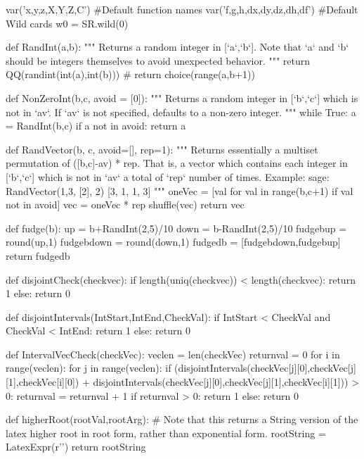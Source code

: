 \documentclass{ximera}
\begin{document}
\begin{sagesilent}
var('x,y,z,X,Y,Z,C')
#Default function names
var('f,g,h,dx,dy,dz,dh,df')
#Default Wild cards
w0 = SR.wild(0)


def RandInt(a,b):
    """ Returns a random integer in [`a`,`b`]. Note that `a` and `b` should be integers themselves to avoid unexpected behavior.
    """
    return QQ(randint(int(a),int(b)))
    # return choice(range(a,b+1))

def NonZeroInt(b,c, avoid = [0]):
    """ Returns a random integer in [`b`,`c`] which is not in `av`. 
        If `av` is not specified, defaults to a non-zero integer.
    """
    while True:
        a = RandInt(b,c)
        if a not in avoid:
            return a

def RandVector(b, c, avoid=[], rep=1):
    """ Returns essentially a multiset permutation of ([b,c]-av) * rep.
        That is, a vector which contains each integer in [`b`,`c`] which is not in `av` a total of `rep` number of times.
        Example:
        sage: RandVector(1,3, [2], 2)
        [3, 1, 1, 3]
    """
    oneVec = [val for val in range(b,c+1) if val not in avoid]
    vec = oneVec * rep
    shuffle(vec)
    return vec


def fudge(b):
    up = b+RandInt(2,5)/10
    down = b-RandInt(2,5)/10
    fudgebup = round(up,1)
    fudgebdown = round(down,1)
    fudgedb = [fudgebdown,fudgebup]
    return fudgedb

def disjointCheck(checkvec):
    if length(uniq(checkvec)) < length(checkvec):
        return 1
    else:
        return 0

def disjointIntervals(IntStart,IntEnd,CheckVal):
    if IntStart < CheckVal and CheckVal < IntEnd:
        return 1
    else:
        return 0

def IntervalVecCheck(checkVec):
    veclen = len(checkVec)
    returnval = 0
    for i in range(veclen):
        for j in range(veclen):
            if (disjointIntervals(checkVec[j][0],checkVec[j][1],checkVec[i][0]) + disjointIntervals(checkVec[j][0],checkVec[j][1],checkVec[i][1])) > 0:
                returnval = returnval + 1
    if returnval > 0:
        return 1
    else:
        return 0


def higherRoot(rootVal,rootArg):
    # Note that this returns a String version of the latex higher root in root form, rather than exponential form.
    rootString = LatexExpr(r'')
    return rootString


\end{sagesilent}
\end{document}
